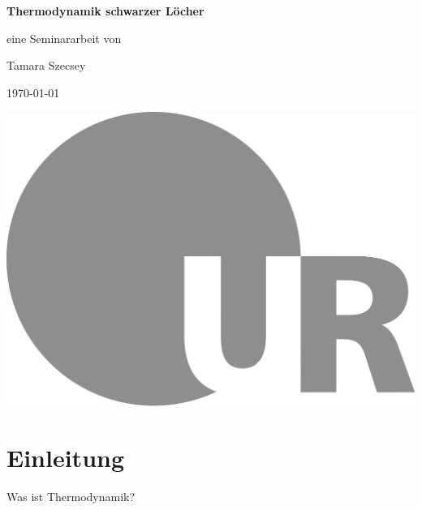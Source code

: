 \documentclass[ngerman]{scrartcl}
\begin{document}
 
	\begin{titlepage}
		\begin{minipage}[c][\textheight][c]{\textwidth}
			\begin{center}
				{ \Huge \textbf{Thermodynamik schwarzer Löcher} }
				
				\vspace*{1cm}
				{\large eine Seminararbeit von}
				
				\vspace*{0.2cm}
				{\Large Tamara Szecsey}
				
				\vspace*{1cm}
				{\large \today}
				
				\vspace*{4cm}
				\hspace*{1cm} \includegraphics[height=30ex]{LOGO_UR}
			\end{center}
		\end{minipage}
	\end{titlepage}
	
\tableofcontents
\newpage
\section{Einleitung}
Was ist Thermodynamik?
\end{document}
